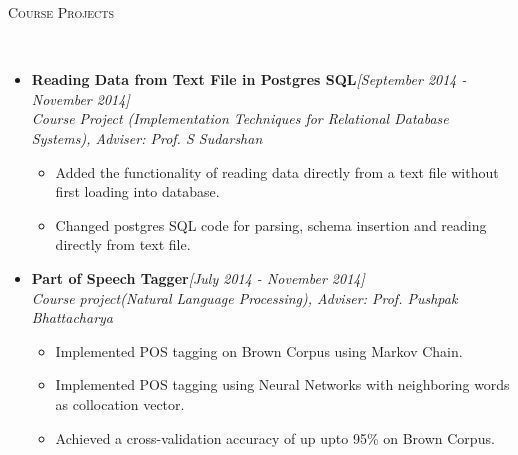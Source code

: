\documentclass[a4paper,10pt]{article}
\newenvironment{changemargin}[2]{%
	\begin{list}{}{%
			\setlength{\topsep}{0pt}%
			\setlength{\leftmargin}{#1}%
			\setlength{\rightmargin}{#2}%
			\setlength{\listparindent}{\parindent}%
			\setlength{\parsep}{\parskip}%
		}%
		\item[]}{\end{list}
}
\newcommand{\lineover}{
	\begin{changemargin}{-0.0in}{-0.0in}
		\vspace*{-8pt}
		\hrulefill \\
		\vspace*{-2pt}
	\end{changemargin}
}
\newcommand{\header}[1]{
	\begin{changemargin}{-0.0in}{-0.0in}
		\large	\scshape {#1}\\	
		\lineover
	\end{changemargin}
}
\newenvironment{body} {
	\vspace*{-16pt}
	\begin{changemargin}{-0.0in}{-0.in}
	}	
	{\end{changemargin}
}
\begin{document}
	\vspace{-1ex}
	\header{Course Projects}
    \vspace{-0.5ex}
	\begin{body}
		\vspace{14pt}
		\begin{itemize}
			\setlength{\itemindent}{0em}
			
			
			\item \textbf{Reading Data from Text File in Postgres SQL}\hfill \emph{[September 2014 - November 2014]} \\
			\emph{Course Project (Implementation Techniques for Relational Database Systems), Adviser: Prof. S Sudarshan}
			\vspace{-1ex}
			\begin{itemize}
				\setlength{\itemindent}{0em}
				\item Added the functionality of reading data directly from a text file without first loading into database.
				\vspace{-0.5ex}
				\item Changed postgres SQL code for parsing, schema insertion and reading directly from text file.
			\end{itemize}				    
			\vspace{-1ex}
			\item \textbf{Part of Speech Tagger}\hfill \emph{[July 2014 - November 2014]} \\
			\emph{Course project(Natural Language Processing), Adviser: Prof. Pushpak Bhattacharya}
			\vspace{-1ex}
			\begin{itemize}
				\setlength{\itemindent}{0em}
				\item Implemented POS tagging on Brown Corpus using Markov Chain.
				\vspace{-0.5ex}
				\item Implemented POS tagging using Neural Networks with neighboring words as collocation vector. 
				\vspace{-0.5ex}
				\item Achieved a cross-validation accuracy of up upto 95\% on Brown Corpus.
			\end{itemize}
			

\end{itemize}
\end{body}
\end{document}
